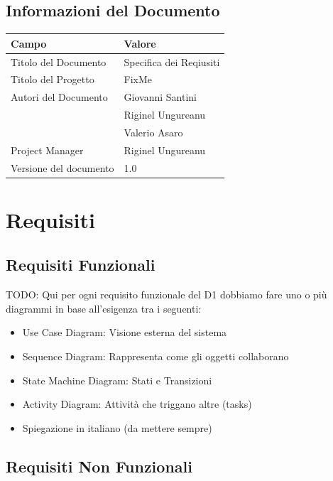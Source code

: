 \documentclass{report}
\begin{document}
	
	
	\section{Informazioni del Documento}
	
	\begin{center} %
		\centering
		\begin{tabular}{ |p{4cm}|p{4cm}|  }
			\hline
			\centering Campo & \qquad\qquad Valore \\ %
			\hline
			Titolo del Documento & Specifica dei Reqiusiti \\
			\hline
			Titolo del Progetto & FixMe \\
			\hline
			Autori del Documento &
			Giovanni Santini \\ & Riginel Ungureanu \\ & Valerio Asaro \\
			\hline
			Project Manager & Riginel Ungureanu\\
			\hline
			Versione del documento & 1.0 \\
			\hline
		\end{tabular}
	\end{center}


\chapter{Requisiti}

	
\section{Requisiti Funzionali}

TODO: Qui per ogni requisito funzionale del D1 dobbiamo fare uno o più diagrammi in base all'esigenza tra i seguenti:
\begin{itemize}
	\item Use Case Diagram: Visione esterna del sistema
	\item Sequence Diagram: Rappresenta come gli oggetti collaborano
	\item State Machine Diagram: Stati e Transizioni
	\item Activity Diagram: Attività che triggano altre (tasks)
	\item Spiegazione in italiano (da mettere sempre)
\end{itemize}

\section{Requisiti Non Funzionali}
\end{document}
